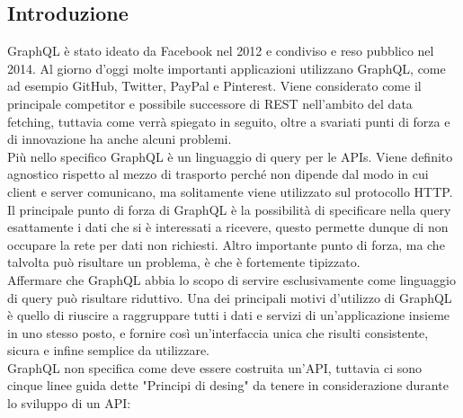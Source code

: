 \subsection*{Introduzione}
GraphQL è stato ideato da Facebook nel 2012 e condiviso e reso pubblico nel 2014. Al giorno d'oggi molte importanti applicazioni  utilizzano GraphQL, come ad esempio GitHub, Twitter, PayPal e Pinterest. Viene considerato come il principale competitor e possibile successore di REST nell'ambito del data fetching, tuttavia come verrà spiegato in seguito, oltre a svariati punti di forza e di innovazione ha anche alcuni problemi.\\
Più nello specifico GraphQL è un linguaggio di query per le APIs. Viene definito agnostico rispetto al mezzo di trasporto perché non dipende dal modo in cui client e server comunicano, ma solitamente viene utilizzato sul protocollo HTTP. Il principale punto di forza di GraphQL è la possibilità di specificare nella query esattamente i dati che si è interessati a ricevere, questo permette dunque di non occupare la rete per dati non richiesti. Altro importante punto di forza, ma che talvolta può risultare un problema, è che è fortemente tipizzato.\\
Affermare che GraphQL abbia lo scopo di servire esclusivamente come linguaggio di query può risultare riduttivo. Una dei principali motivi d'utilizzo di GraphQL è quello di riuscire a raggruppare tutti i dati e servizi di un'applicazione insieme in uno stesso posto, e fornire così un'interfaccia unica che risulti consistente, sicura e infine semplice da utilizzare.\\
GraphQL non specifica come deve essere costruita un'API, tuttavia ci sono cinque linee guida dette "Principi di desing" da tenere in considerazione durante lo sviluppo di un API:
